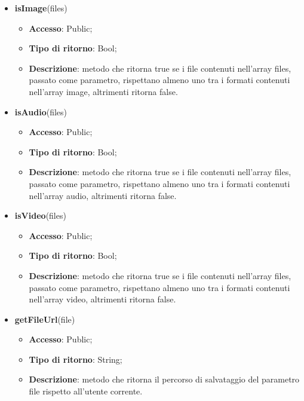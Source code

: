 {{{\begin{itemize}
\begin{itemize}
					\item \textbf{Tipo di ritorno}: Void;
					\item \textbf{Descrizione}: metodo che invia una richiesta XMLHttpRequest a \textit{[hostname]\-/private/api/files//} effettuando l'upload dei file contenuti nell'array files passato come parametro. Se l'operazione ha successo viene richiamato callback, altrimenti viene lanciato un errore.
				\end{itemize}
				\item \textbf{isImage}(files)
				\begin{itemize}
					\item \textbf{Accesso}: Public;
					\item \textbf{Tipo di ritorno}: Bool;
					\item \textbf{Descrizione}: metodo che ritorna true se i file contenuti nell'array files, passato come parametro, rispettano almeno uno tra i formati contenuti nell'array image, altrimenti ritorna false.
				\end{itemize}
				\item \textbf{isAudio}(files)
				\begin{itemize}
					\item \textbf{Accesso}: Public;
					\item \textbf{Tipo di ritorno}: Bool;
					\item \textbf{Descrizione}: metodo che ritorna true se i file contenuti nell'array files, passato come parametro, rispettano almeno uno tra i formati contenuti nell'array audio, altrimenti ritorna false.
				\end{itemize}
				\item \textbf{isVideo}(files)
				\begin{itemize}
					\item \textbf{Accesso}: Public;
					\item \textbf{Tipo di ritorno}: Bool;
					\item \textbf{Descrizione}: metodo che ritorna true se i file contenuti nell'array files, passato come parametro, rispettano almeno uno tra i formati contenuti nell'array video, altrimenti ritorna false.
				\end{itemize}
				\item \textbf{getFileUrl}(file)
				\begin{itemize}
					\item \textbf{Accesso}: Public;
					\item \textbf{Tipo di ritorno}: String;
					\item \textbf{Descrizione}: metodo che ritorna il percorso di salvataggio del parametro file rispetto all'utente corrente.
				\end{itemize}
			\end{itemize} 
		}
}}
